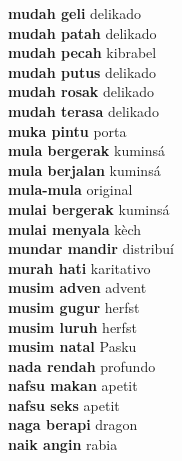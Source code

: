 \textbf{ mudah geli  } delikado \\
\textbf{ mudah patah  } delikado \\
\textbf{ mudah pecah  } kibrabel \\
\textbf{ mudah putus  } delikado \\
\textbf{ mudah rosak  } delikado \\
\textbf{ mudah terasa  } delikado \\
\textbf{ muka pintu  } porta \\
\textbf{ mula bergerak  } kuminsá \\
\textbf{ mula berjalan  } kuminsá \\
\textbf{ mula-mula  } original \\
\textbf{ mulai bergerak  } kuminsá \\
\textbf{ mulai menyala  } kèch \\
\textbf{ mundar mandir  } distribuí \\
\textbf{ murah hati  } karitativo \\
\textbf{ musim adven  } advent \\
\textbf{ musim gugur  } herfst \\
\textbf{ musim luruh  } herfst \\
\textbf{ musim natal  } Pasku \\
\textbf{ nada rendah  } profundo \\
\textbf{ nafsu makan  } apetit \\
\textbf{ nafsu seks  } apetit \\
\textbf{ naga berapi  } dragon \\
\textbf{ naik angin  } rabia \\
